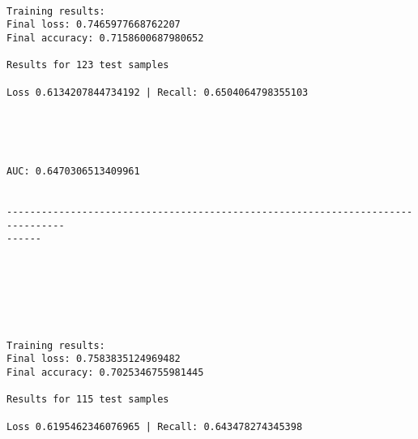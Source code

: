 \documentclass[11pt]{article}
\begin{document}
    \begin{Verbatim}[commandchars=\\\{\}]

Training results:
Final loss: 0.7465977668762207
Final accuracy: 0.7158600687980652

Results for 123 test samples

Loss 0.6134207844734192 | Recall: 0.6504064798355103



    \end{Verbatim}

    \begin{center}
    \end{center}
    { \hspace*{\fill} \\}
    
    \begin{Verbatim}[commandchars=\\\{\}]
AUC: 0.6470306513409961


--------------------------------------------------------------------------------
------


    \end{Verbatim}

    \begin{center}
    \end{center}
    { \hspace*{\fill} \\}
    
    \begin{center}
    \end{center}
    { \hspace*{\fill} \\}
    
    \begin{Verbatim}[commandchars=\\\{\}]

Training results:
Final loss: 0.7583835124969482
Final accuracy: 0.7025346755981445

Results for 115 test samples

Loss 0.6195462346076965 | Recall: 0.643478274345398



    \end{Verbatim}
\end{document}
